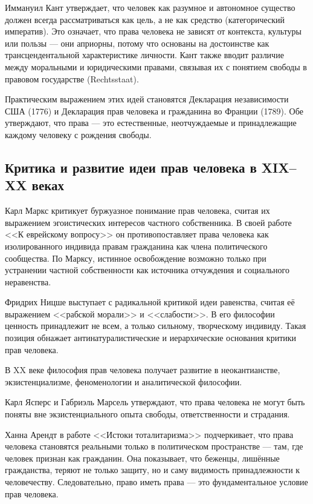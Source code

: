 \documentclass[12pt,a4paper]{article}
\begin{document}
	Иммануил Кант утверждает, что человек как разумное и автономное существо должен всегда рассматриваться как цель, а не как средство (категорический императив). Это означает, что права человека не зависят от контекста, культуры или пользы — они априорны, потому что основаны на достоинстве как трансцендентальной характеристике личности. Кант также вводит различие между моральными и юридическими правами, связывая их с понятием свободы в правовом государстве (Rechtsstaat).
	
	Практическим выражением этих идей становятся Декларация независимости США (1776) и Декларация прав человека и гражданина во Франции (1789). Обе утверждают, что права — это естественные, неотчуждаемые и принадлежащие каждому человеку с рождения свободы.
	
	\subsection{Критика и развитие идеи прав человека в XIX–XX веках}
	Карл Маркс критикует буржуазное понимание прав человека, считая их выражением эгоистических интересов частного собственника. В своей работе <<К еврейскому вопросу>> он противопоставляет права человека как изолированного индивида правам гражданина как члена политического сообщества. По Марксу, истинное освобождение возможно только при устранении частной собственности как источника отчуждения и социального неравенства.
	
	Фридрих Ницше выступает с радикальной критикой идеи равенства, считая её выражением <<рабской морали>> и <<слабости>>. В его философии ценность принадлежит не всем, а только сильному, творческому индивиду. Такая позиция обнажает антинатуралистические и иерархические основания критики прав человека.
	
	В XX веке философия прав человека получает развитие в неокантианстве, экзистенциализме, феноменологии и аналитической философии.
	
	Карл Ясперс и Габриэль Марсель утверждают, что права человека не могут быть поняты вне экзистенциального опыта свободы, ответственности и страдания.
	
	Ханна Арендт в работе <<Истоки тоталитаризма>> подчеркивает, что права человека становятся реальными только в политическом пространстве — там, где человек признан как гражданин. Она показывает, что беженцы, лишённые гражданства, теряют не только защиту, но и саму видимость принадлежности к человечеству. Следовательно, право иметь права — это фундаментальное условие прав человека.
	
\end{document}
